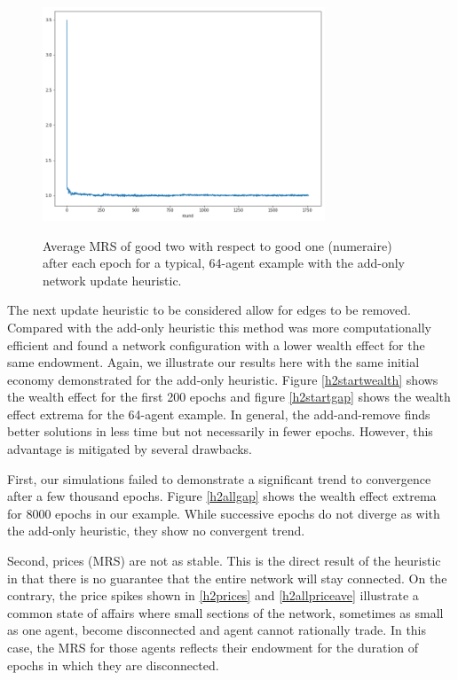 \documentclass[smallextended]{svjour3}
\begin{document}
\begin{figure}
  \caption{Average MRS of good two with respect to good one (numeraire) after each epoch for a typical, 64-agent example with the add-only network update heuristic. }
  \includegraphics[width=0.75\textwidth]{h1allpriceave.png}
  \label{h1allpriceave}
\end{figure}


The next update heuristic to be considered allow for edges to be removed.
Compared with the add-only heuristic this method was more computationally
efficient and found a network configuration with a lower wealth effect for the
same endowment. Again, we illustrate our results here with the same initial economy
demonstrated for the add-only heuristic.
Figure \ref{h2startwealth} shows the wealth effect for the first 200 epochs
and figure \ref{h2startgap} shows the wealth effect extrema for the 64-agent example.
In general, the add-and-remove finds better solutions in less time but
not necessarily in fewer epochs.
However, this advantage is mitigated by several drawbacks.

First, our simulations failed to demonstrate a significant trend to convergence after a few
thousand epochs. Figure \ref{h2allgap} shows the wealth effect extrema for 8000
epochs in our example. While successive epochs do not diverge as with the
add-only heuristic, they show no convergent trend.

Second, prices (MRS) are not as stable. This is the direct result of the
heuristic in that there is no guarantee that the entire network will stay
connected.
On the contrary, the price spikes shown in \ref{h2prices} and \ref{h2allpriceave} illustrate a common
state of affairs where small sections of the network, sometimes as small as one agent,
become disconnected and agent cannot rationally trade. In this case, the MRS for
those agents reflects their endowment for the duration of epochs in which they
are disconnected.
\end{document}
